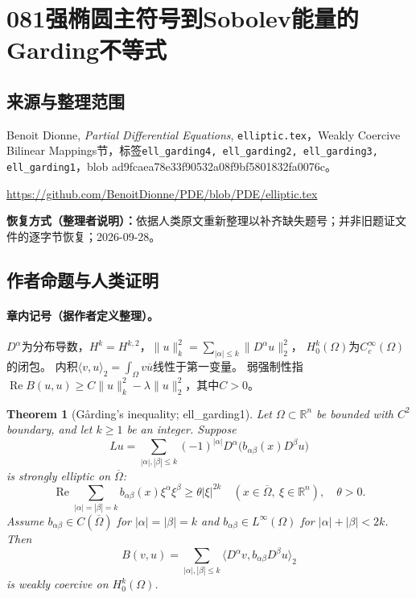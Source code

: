 \documentclass[UTF8,11pt]{ctexart}
\newtheorem*{theorem}{Theorem}
\theoremstyle{definition}
\begin{document}
\section*{081\quad 强椭圆主符号到Sobolev能量的Garding不等式}
\subsection*{来源与整理范围}
Benoit Dionne, \emph{Partial Differential Equations}, \texttt{elliptic.tex}，Weakly Coercive Bilinear Mappings节，标签\texttt{ell\_garding4, ell\_garding2, ell\_garding3, ell\_garding1}，blob ad9fcaea78e33f90532a08f9bf5801832fa0076c。
\par\url{https://github.com/BenoitDionne/PDE/blob/PDE/elliptic.tex}
\par\textbf{恢复方式（整理者说明）：}依据人类原文重新整理以补齐缺失题号；并非旧题证文件的逐字节恢复；2026-09-28。
\subsection*{作者命题与人类证明}

\paragraph{章内记号（据作者定义整理）。}
$D^\alpha$为分布导数，$H^k=H^{k,2}$，$\|u\|_k^2=\sum_{|\alpha|\leq k}\|D^\alpha u\|_2^2$，
$H^k_0(\Omega)$为$C_c^\infty(\Omega)$的闭包。
内积$\langle v,u\rangle_2=\int_\Omega v\overline u$线性于第一变量。
弱强制性指$\operatorname{Re}B(u,u)\geq C\|u\|_k^2-\lambda\|u\|_2^2$，其中$C>0$。
\begin{theorem}[G\aa rding's inequality; ell\_garding1]
Let $\Omega\subset\mathbb R^n$ be bounded with $C^2$ boundary, and let
$k\geq1$ be an integer. Suppose
\[
Lu=\sum_{|\alpha|,|\beta|\leq k}(-1)^{|\alpha|}
D^\alpha\bigl(b_{\alpha\beta}(x)D^\beta u\bigr)
\]
is strongly elliptic on $\overline\Omega$:
\[
\operatorname{Re}\sum_{|\alpha|=|\beta|=k}b_{\alpha\beta}(x)\xi^\alpha\xi^\beta
\geq\theta|\xi|^{2k}\quad(x\in\overline\Omega,\ \xi\in\mathbb R^n),\quad\theta>0.
\]
Assume $b_{\alpha\beta}\in C(\overline\Omega)$ for $|\alpha|=|\beta|=k$
and $b_{\alpha\beta}\in L^\infty(\Omega)$ for $|\alpha|+|\beta|<2k$.
Then
\[
B(v,u)=\sum_{|\alpha|,|\beta|\leq k}
\langle D^\alpha v,b_{\alpha\beta}D^\beta u\rangle_2
\]
is weakly coercive on $H^k_0(\Omega)$.
\end{theorem}
\end{document}
